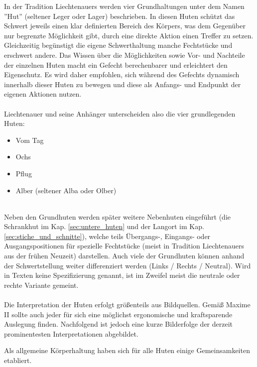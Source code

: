 In der Tradition Liechtenauers werden vier Grundhaltungen unter dem Namen ''Hut'' (seltener Leger oder Lager) beschrieben.
In diesen Huten schützt das Schwert jeweils einen klar definierten Bereich des Körpers, was dem Gegenüber nur begrenzte Möglichkeit gibt, durch eine direkte Aktion einen Treffer zu setzen.
Gleichzeitig begünstigt die eigene Schwerthaltung manche Fechtstücke und erschwert andere.
Das Wissen über die Möglichkeiten sowie Vor- und Nachteile der einzelnen Huten macht ein Gefecht berechenbarer und erleichtert den Eigenschutz.
Es wird daher empfohlen, sich während des Gefechts dynamisch innerhalb dieser Huten zu bewegen und  diese als Anfangs- und Endpunkt der eigenen Aktionen nutzen.
\\
\\
Liechtenauer und seine Anhänger unterscheiden also die vier grundlegenden Huten:
\enlargethispage{2\baselineskip}
\begin{itemize}
    \item Vom Tag
    \item Ochs
    \item Pflug
    \item Alber (seltener Alba oder Olber)
\end{itemize}

\hspace{1cm}
\\
Neben den Grundhuten werden später weitere Nebenhuten eingeführt (die Schrankhut im Kap. \ref{sec:untere_huten} und der Langort im Kap. \ref{sec:stiche_und_schnitte}), welche teils Übergangs-, Eingangs- oder Ausgangspositionen für spezielle Fechtstücke (meist in Tradition Liechtenauers aus der frühen Neuzeit) darstellen.
Auch viele der Grundhuten können anhand der Schwertstellung weiter differenziert werden (Links / Rechts / Neutral).
Wird in Texten keine Spezifizierung genannt, ist im Zweifel meist die neutrale oder rechte Variante gemeint.
\\
\\
Die Interpretation der Huten erfolgt größenteils aus Bildquellen.
Gemäß Maxime II sollte auch jeder für sich eine möglichst ergonomische und kraftsparende Auslegung finden.
Nachfolgend ist jedoch eine kurze Bilderfolge der derzeit prominentesten Interpretationen abgebildet.

\newpage

Als allgemeine Körperhaltung haben sich für alle Huten einige Gemeinsamkeiten etabliert.

